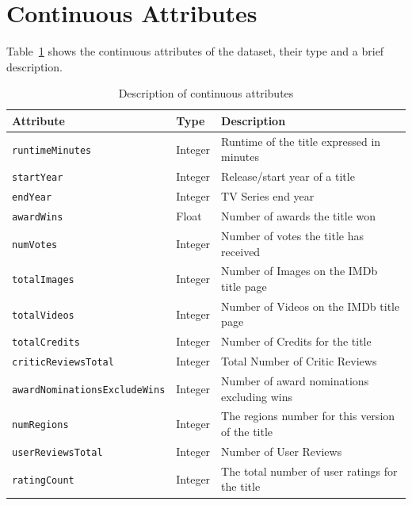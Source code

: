 \section{Continuous Attributes}
Table~\ref{tab:numerical_attributes} shows the continuous attributes of the dataset, their type and
a brief description.
\begin{table}[h]
    \centering             
    

    \begin{tabular}{|l|l|l|} 
        \hline
        \textbf{Attribute} & \textbf{Type} & \textbf{Description} \\
        \hline
        \texttt{runtimeMinutes} & Integer & Runtime of the title expressed in minutes \\ 
        \hline
        \texttt{startYear} & Integer & Release/start year of a title \\ 
        \hline
        \texttt{endYear} & Integer & TV Series end year \\
        \hline
        \texttt{awardWins} & Float & Number of awards the title won \\ 
        \hline
        \texttt{numVotes} & Integer & Number of votes the title has received \\ 
        \hline
        \texttt{totalImages} & Integer & Number of Images on the IMDb title page \\ 
        \hline
        \texttt{totalVideos} & Integer & Number of Videos on the IMDb title page \\ 
        \hline
        \texttt{totalCredits} & Integer & Number of Credits for the title \\ 
        \hline
        \texttt{criticReviewsTotal} & Integer & Total Number of Critic Reviews \\ 
        \hline
        \texttt{awardNominationsExcludeWins} & Integer & Number of award nominations excluding wins \\ 
        \hline
        \texttt{numRegions} & Integer & The regions number for this version of the title \\ 
        \hline
        \texttt{userReviewsTotal} & Integer & Number of User Reviews \\ 
        \hline
        \texttt{ratingCount} & Integer & The total number of user ratings for the title \\ 
        \hline
    \end{tabular}
    \caption{Description of continuous attributes}
    \label{tab:numerical_attributes}
\end{table}

